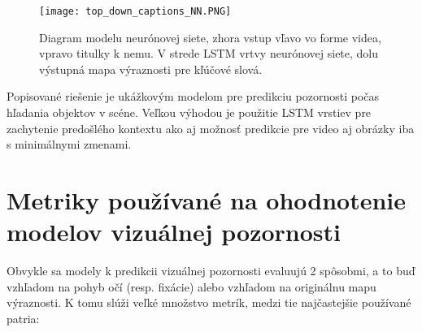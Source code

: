 \begin{figure}[H]
	\begin{center}
		\texttt{[image: top\_down\_captions\_NN.PNG]}
		\caption[Model neurónovej siete pre predikciu na základe kľúčových slov]{Diagram modelu neurónovej siete\cite{ramanishka2017top}, zhora vstup vľavo vo forme videa, vpravo titulky k nemu. V strede LSTM vrtvy neurónovej siete, dolu výstupná mapa výraznosti pre kľúčové slová. \label{top_down_captions_model_image}}
	\end{center}
\end{figure}

Popisované riešenie je ukážkovým modelom pre predikciu pozornosti počas hľadania objektov v scéne. Veľkou výhodou je použitie LSTM vrstiev pre zachytenie predošlého kontextu ako aj možnosť predikcie pre video aj obrázky iba s minimálnymi zmenami.


\newpage
\null
\thispagestyle{empty}
\newpage

\section{Metriky používané na ohodnotenie modelov vizuálnej pozornosti}
\label{metric}

Obvykle sa modely k predikcii vizuálnej pozornosti evaluujú 2 spôsobmi, a to buď vzhľadom na pohyb očí (resp. fixácie) alebo vzhľadom na originálnu mapu výraznosti. K tomu slúži veľké množstvo metrík\cite{metriky}, medzi tie najčastejšie používané patria:

